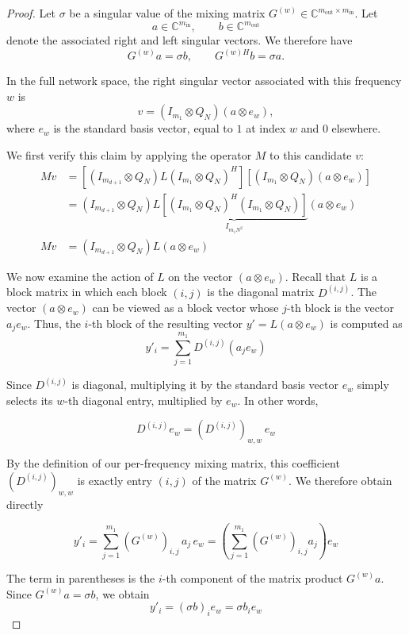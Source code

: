 \begin{proof}

Let $\sigma$ be a singular value of the mixing matrix
$G^{(w)}\in\mathbb{C}^{m_{\mathrm{out}}\times m_{\mathrm{in}}}$.
Let
\[
    a\in\mathbb{C}^{m_{\mathrm{in}}},
    \qquad
    b\in\mathbb{C}^{m_{\mathrm{out}}}
\]
denote the associated right and left singular vectors. We therefore have
\[
    G^{(w)}a=\sigma b,
    \qquad
    G^{(w)H}b=\sigma a.
\]

In the full network space, the right singular vector associated with this frequency $w$ is
\[
    v = (I_{m_1} \otimes Q_N) (a \otimes e_w),
\]
where $e_w$ is the standard basis vector, equal to $1$ at index $w$ and $0$ elsewhere.

We first verify this claim by applying the operator $M$ to this candidate $v$:
\begin{align*}
M v &= \left[ (I_{m_{d+1}} \otimes Q_N) L (I_{m_1} \otimes Q_N)^H \right] \left[ (I_{m_1} \otimes Q_N) (a \otimes e_w) \right] \\
&= (I_{m_{d+1}} \otimes Q_N) L \underbrace{\left[ (I_{m_1} \otimes Q_N)^H (I_{m_1} \otimes Q_N) \right]}_{I_{m_1 N^2}} (a \otimes e_w) \\
M v &= (I_{m_{d+1}} \otimes Q_N) L (a \otimes e_w)
\end{align*}

We now examine the action of $L$ on the vector $(a \otimes e_w)$. Recall that $L$ is a block matrix in which
each block $(i,j)$ is the diagonal matrix $D^{(i,j)}$.
The vector $(a \otimes e_w)$ can be viewed as a block vector whose $j$-th block is the vector $a_j e_w$.
Thus, the $i$-th block of the resulting vector $y' = L (a \otimes e_w)$ is computed as
\[
y'_i = \sum_{j=1}^{m_1} D^{(i,j)} (a_j e_w)
\]

Since $D^{(i,j)}$ is diagonal, multiplying it by the standard basis vector $e_w$
simply selects its $w$-th diagonal entry, multiplied by $e_w$.
In other words,

$$D^{(i,j)} e_w = (D^{(i,j)})_{w,w} \, e_w$$

By the definition of our per-frequency mixing matrix, this coefficient $(D^{(i,j)})_{w,w}$ is
exactly entry $(i,j)$ of the matrix $G^{(w)}$. We therefore obtain directly

$$y'_i = \sum_{j=1}^{m_1} (G^{(w)})_{i,j} \, a_j \, e_w = \left( \sum_{j=1}^{m_1} (G^{(w)})_{i,j} a_j \right) e_w$$

The term in parentheses is the $i$-th component of the matrix product $G^{(w)} a$.
Since $G^{(w)} a = \sigma b$, we obtain
\[
y'_i = (\sigma b)_i e_w = \sigma b_i e_w
\]


\end{proof}
